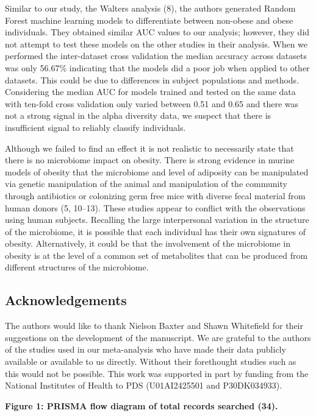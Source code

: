 \documentclass[12pt,]{article}
\begin{document}
Similar to our study, the Walters analysis (8), the authors generated
Random Forest machine learning models to differentiate between non-obese
and obese individuals. They obtained similar AUC values to our analysis;
however, they did not attempt to test these models on the other studies
in their analysis. When we performed the inter-dataset cross validation
the median accuracy across datasets was only 56.67\% indicating that the
models did a poor job when applied to other datasets. This could be due
to differences in subject populations and methods. Considering the
median AUC for models trained and tested on the same data with ten-fold
cross validation only varied between 0.51 and 0.65 and there was not a
strong signal in the alpha diversity data, we suspect that there is
insufficient signal to reliably classify individuals.

Although we failed to find an effect it is not realistic to necessarily
state that there is no microbiome impact on obesity. There is strong
evidence in murine models of obesity that the microbiome and level of
adiposity can be manipulated via genetic manipulation of the animal and
manipulation of the community through antibiotics or colonizing germ
free mice with diverse fecal material from human donors (5, 10--13).
These studies appear to conflict with the observations using human
subjects. Recalling the large interpersonal variation in the structure
of the microbiome, it is possible that each individual has their own
signatures of obesity. Alternatively, it could be that the involvement
of the microbiome in obesity is at the level of a common set of
metabolites that can be produced from different structures of the
microbiome.

\subsection{Acknowledgements}\label{acknowledgements}

The authors would like to thank Nielson Baxter and Shawn Whitefield for
their suggestions on the development of the manuscript. We are grateful
to the authors of the studies used in our meta-analysis who have made
their data publicly available or available to us directly. Without their
forethought studies such as this would not be possible. This work was
supported in part by funding from the National Institutes of Health to
PDS (U01AI2425501 and P30DK034933).

\newpage

\textbf{Figure 1: PRISMA flow diagram of total records searched (34).}
\end{document}
